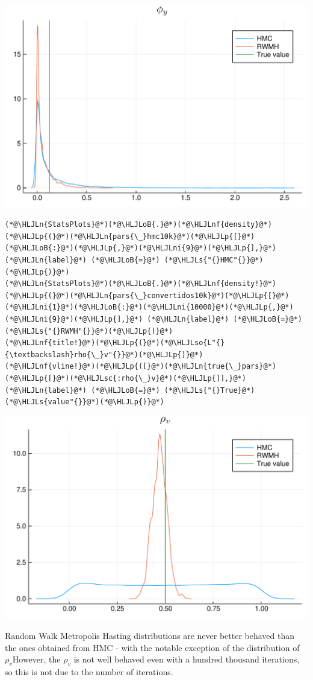 \documentclass[12pt,a4paper]{article}
\newcommand{\HLJLn}[1]{#1}
\newcommand{\HLJLnf}[1]{\textcolor[RGB]{66,102,213}{#1}}
\newcommand{\HLJLs}[1]{\textcolor[RGB]{201,61,57}{#1}}
\newcommand{\HLJLsc}[1]{\textcolor[RGB]{201,61,57}{#1}}
\newcommand{\HLJLso}[1]{\textcolor[RGB]{201,61,57}{#1}}
\newcommand{\HLJLni}[1]{\textcolor[RGB]{59,151,46}{#1}}
\newcommand{\HLJLoB}[1]{\textcolor[RGB]{102,102,102}{\textbf{#1}}}
\newcommand{\HLJLp}[1]{#1}
\begin{document}
\includegraphics[width=\linewidth]{figures/dsge_and_julia_60_1.pdf}

\begin{lstlisting}
(*@\HLJLn{StatsPlots}@*)(*@\HLJLoB{.}@*)(*@\HLJLnf{density}@*)(*@\HLJLp{(}@*)(*@\HLJLn{pars{\_}hmc10k}@*)(*@\HLJLp{[}@*)(*@\HLJLoB{:}@*)(*@\HLJLp{,}@*)(*@\HLJLni{9}@*)(*@\HLJLp{],}@*) (*@\HLJLn{label}@*) (*@\HLJLoB{=}@*) (*@\HLJLs{"{}HMC"{}}@*)(*@\HLJLp{)}@*)
(*@\HLJLn{StatsPlots}@*)(*@\HLJLoB{.}@*)(*@\HLJLnf{density!}@*)(*@\HLJLp{(}@*)(*@\HLJLn{pars{\_}convertidos10k}@*)(*@\HLJLp{[}@*)(*@\HLJLni{1}@*)(*@\HLJLoB{:}@*)(*@\HLJLni{10000}@*)(*@\HLJLp{,}@*)(*@\HLJLni{9}@*)(*@\HLJLp{],}@*) (*@\HLJLn{label}@*) (*@\HLJLoB{=}@*) (*@\HLJLs{"{}RWMH"{}}@*)(*@\HLJLp{)}@*)
(*@\HLJLnf{title!}@*)(*@\HLJLp{(}@*)(*@\HLJLso{L"{}{\textbackslash}rho{\_}v"{}}@*)(*@\HLJLp{)}@*)
(*@\HLJLnf{vline!}@*)(*@\HLJLp{([}@*)(*@\HLJLn{true{\_}pars}@*)(*@\HLJLp{[}@*)(*@\HLJLsc{:rho{\_}v}@*)(*@\HLJLp{]],}@*) (*@\HLJLn{label}@*) (*@\HLJLoB{=}@*) (*@\HLJLs{"{}True}@*) (*@\HLJLs{value"{}}@*)(*@\HLJLp{)}@*)
\end{lstlisting}

\includegraphics[width=\linewidth]{figures/dsge_and_julia_61_1.pdf}

Random Walk Metropolis Hasting distributions are never better behaved than the ones obtained from HMC - with the notable exception of the distribution of $\rho_v$However, the $\rho_v$ is not well behaved even with a hundred thousand iterations, so this is not due to the number of iterations.  



\end{document}
